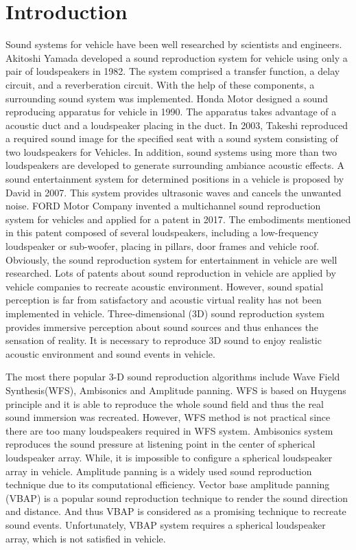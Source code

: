 \documentclass[runningheads,a4paper]{llncs}
\begin{document}
\section{Introduction}\label{sec:Intro}
Sound systems for vehicle have been well researched by scientists and engineers.   Akitoshi Yamada developed a sound reproduction system for vehicle using only a pair of loudspeakers in 1982\cite{Akito82}. The system comprised a transfer function, a delay circuit, and a reverberation circuit. With the help of these components, a surrounding sound system was implemented.
Honda Motor designed a sound reproducing apparatus for vehicle in 1990\cite{terai1990sound}. The apparatus takes advantage of a acoustic duct and a loudspeaker placing in the duct.
In 2003, Takeshi reproduced a required sound image for the specified seat with a sound system consisting of two loudspeakers for Vehicles\cite{Takeshi03}.
In addition, sound systems using more than two loudspeakers are developed to generate surrounding ambiance acoustic effects\cite{clark1998vehicle}\cite{orellana2015loudspeaker}. A sound entertainment system for determined positions in a vehicle is proposed by David in 2007. This system provides ultrasonic waves and cancels the unwanted noise\cite{David07}.
FORD Motor Company invented a multichannel sound reproduction system for vehicles and applied for a patent in 2017\cite{orellana2015loudspeaker}. The embodiments mentioned in this patent composed of several loudspeakers, including a low-frequency loudspeaker or sub-woofer, placing in pillars, door frames and vehicle roof. Obviously, the sound reproduction system for entertainment in vehicle are well researched. Lots of patents about sound reproduction in vehicle are applied by vehicle companies to recreate acoustic environment\cite{David07}\cite{Simon2005}\cite{Miriam2014}\cite{Gibson15}. However, sound spatial perception is far from satisfactory and acoustic virtual reality has not been implemented in vehicle. Three-dimensional (3D) sound reproduction system provides immersive perception about sound sources and thus enhances the sensation of reality\cite{AasthaTASLP11}\cite{Danilo15TMM}\cite{zms2015}. It is necessary to reproduce 3D sound to enjoy realistic acoustic environment and sound events in vehicle.

The most there popular 3-D sound reproduction algorithms include Wave Field Synthesis(WFS), Ambisonics and Amplitude panning. WFS is based on Huygens principle and it is able to reproduce the whole sound field and thus the real sound immersion was recreated\cite{Gergely17}. However, WFS method is not practical since there are too many loudspeakers required in WFS system. Ambisonics system reproduces the sound pressure at listening point in the center of spherical loudspeaker array. While, it is impossible to configure a spherical loudspeaker array in vehicle. Amplitude panning is a widely used sound reproduction technique due to its computational efficiency. Vector base amplitude panning (VBAP) is a popular sound reproduction technique to render the sound direction and distance. And thus VBAP is considered as a promising technique to recreate sound events\cite{Pulkki01spatial}. Unfortunately, VBAP system requires a spherical loudspeaker array, which is not satisfied in vehicle.
\end{document}
